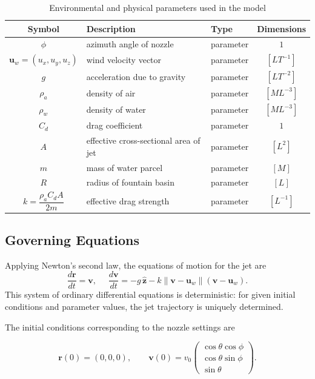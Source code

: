 \documentclass{article}
\begin{document}
\begin{table}[H]
\centering
\renewcommand{\arraystretch}{1.3}
\begin{tabular}{c|l|l|c}
Symbol & Description & Type & Dimensions \\
\hline
$\phi$ & azimuth angle of nozzle & parameter & $1$ \\
$\mathbf{u}_w = (u_x,u_y,u_z)$ & wind velocity vector & parameter & $[LT^{-1}]$ \\
$g$ & acceleration due to gravity & parameter & $[LT^{-2}]$ \\
$\rho_a$ & density of air & parameter & $[ML^{-3}]$ \\
$\rho_w$ & density of water & parameter & $[ML^{-3}]$ \\
$C_d$ & drag coefficient & parameter & $1$ \\
$A$ & effective cross-sectional area of jet & parameter & $[L^2]$ \\
$m$ & mass of water parcel & parameter & $[M]$ \\
$R$ & radius of fountain basin & parameter & $[L]$ \\
$k = \dfrac{\rho_a C_d A}{2m}$ & effective drag strength & parameter & $[L^{-1}]$ \\
\end{tabular}
\caption{Environmental and physical parameters used in the model}
\end{table}


\subsection{Governing Equations}

Applying Newton’s second law, the equations of motion for the jet are \cite{FitzpatrickProjectileDrag}
\[
\frac{d\mathbf{r}}{dt} = \mathbf{v},
\ \ \ \ \ \ 
\frac{d\mathbf{v}}{dt}
= - g\,\hat{\mathbf{z}}
- k \lVert \mathbf{v} - \mathbf{u}_w \rVert (\mathbf{v} - \mathbf{u}_w).
\]
This system of ordinary differential equations is deterministic: for given initial conditions and parameter values, the jet trajectory is uniquely determined.

The initial conditions corresponding to the nozzle settings are \cite{peszynski2019mathematical}

\[
\mathbf{r}(0) = (0,0,0), \qquad
\mathbf{v}(0) = v_0
\begin{pmatrix}
\cos\theta \cos\phi \\
\cos\theta \sin\phi \\
\sin\theta
\end{pmatrix}.
\]
\end{document}
